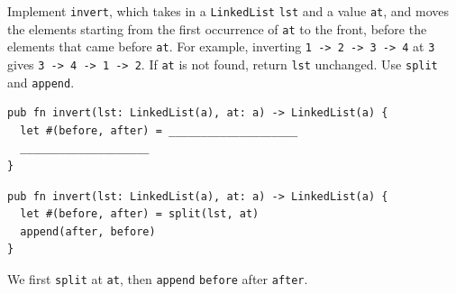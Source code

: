\begin{blocksection}
\question Implement \texttt{invert}, which takes in a \lstinline{LinkedList} \texttt{lst} and a value \texttt{at}, and moves the elements starting from the first occurrence of \texttt{at} to the front, before the elements that came before \texttt{at}. For example, inverting \lstinline{1 -> 2 -> 3 -> 4} at \lstinline{3} gives \lstinline{3 -> 4 -> 1 -> 2}. If \texttt{at} is not found, return \texttt{lst} unchanged. Use \texttt{split} and \texttt{append}.
\begin{lstlisting}
pub fn invert(lst: LinkedList(a), at: a) -> LinkedList(a) {
  let #(before, after) = ____________________
  ____________________
}
\end{lstlisting}
\begin{solution}
\begin{lstlisting}
pub fn invert(lst: LinkedList(a), at: a) -> LinkedList(a) {
  let #(before, after) = split(lst, at)
  append(after, before)
}
\end{lstlisting}
\end{solution}

\begin{questionmeta}
  We first \lstinline{split} at \lstinline{at}, then \lstinline{append} \lstinline{before} after \lstinline{after}.
\end{questionmeta}
\end{blocksection}